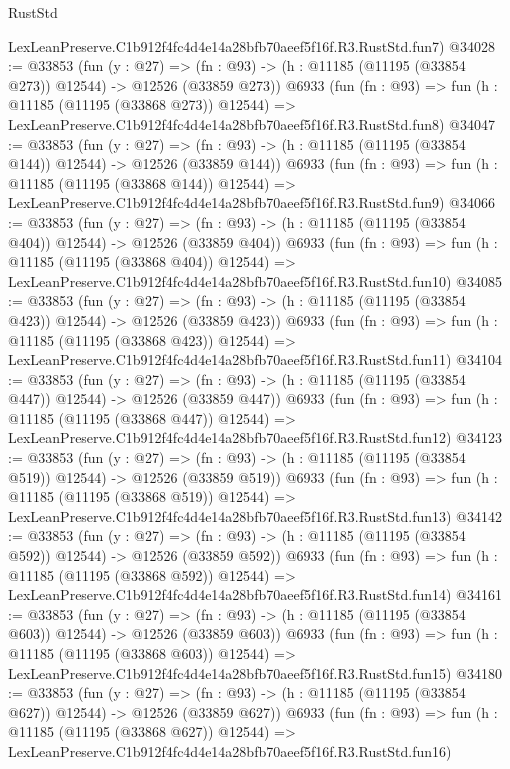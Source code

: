 \begin{lexlean}{RustStd}
\begin{coremodule}
    LexLeanPreserve.C1b912f4fc4d4e14a28bfb70aeef5f16f.R3.RustStd.fun7)
@34028 := @33853
    (fun (y : @27) =>
    (fn : @93) -> (h : @11185 (@11195 (@33854 @273)) @12544) -> @12526 (@33859 @273))
    @6933
    (fun (fn : @93) =>
    fun (h : @11185 (@11195 (@33868 @273)) @12544) =>
    LexLeanPreserve.C1b912f4fc4d4e14a28bfb70aeef5f16f.R3.RustStd.fun8)
@34047 := @33853
    (fun (y : @27) =>
    (fn : @93) -> (h : @11185 (@11195 (@33854 @144)) @12544) -> @12526 (@33859 @144))
    @6933
    (fun (fn : @93) =>
    fun (h : @11185 (@11195 (@33868 @144)) @12544) =>
    LexLeanPreserve.C1b912f4fc4d4e14a28bfb70aeef5f16f.R3.RustStd.fun9)
@34066 := @33853
    (fun (y : @27) =>
    (fn : @93) -> (h : @11185 (@11195 (@33854 @404)) @12544) -> @12526 (@33859 @404))
    @6933
    (fun (fn : @93) =>
    fun (h : @11185 (@11195 (@33868 @404)) @12544) =>
    LexLeanPreserve.C1b912f4fc4d4e14a28bfb70aeef5f16f.R3.RustStd.fun10)
@34085 := @33853
    (fun (y : @27) =>
    (fn : @93) -> (h : @11185 (@11195 (@33854 @423)) @12544) -> @12526 (@33859 @423))
    @6933
    (fun (fn : @93) =>
    fun (h : @11185 (@11195 (@33868 @423)) @12544) =>
    LexLeanPreserve.C1b912f4fc4d4e14a28bfb70aeef5f16f.R3.RustStd.fun11)
@34104 := @33853
    (fun (y : @27) =>
    (fn : @93) -> (h : @11185 (@11195 (@33854 @447)) @12544) -> @12526 (@33859 @447))
    @6933
    (fun (fn : @93) =>
    fun (h : @11185 (@11195 (@33868 @447)) @12544) =>
    LexLeanPreserve.C1b912f4fc4d4e14a28bfb70aeef5f16f.R3.RustStd.fun12)
@34123 := @33853
    (fun (y : @27) =>
    (fn : @93) -> (h : @11185 (@11195 (@33854 @519)) @12544) -> @12526 (@33859 @519))
    @6933
    (fun (fn : @93) =>
    fun (h : @11185 (@11195 (@33868 @519)) @12544) =>
    LexLeanPreserve.C1b912f4fc4d4e14a28bfb70aeef5f16f.R3.RustStd.fun13)
@34142 := @33853
    (fun (y : @27) =>
    (fn : @93) -> (h : @11185 (@11195 (@33854 @592)) @12544) -> @12526 (@33859 @592))
    @6933
    (fun (fn : @93) =>
    fun (h : @11185 (@11195 (@33868 @592)) @12544) =>
    LexLeanPreserve.C1b912f4fc4d4e14a28bfb70aeef5f16f.R3.RustStd.fun14)
@34161 := @33853
    (fun (y : @27) =>
    (fn : @93) -> (h : @11185 (@11195 (@33854 @603)) @12544) -> @12526 (@33859 @603))
    @6933
    (fun (fn : @93) =>
    fun (h : @11185 (@11195 (@33868 @603)) @12544) =>
    LexLeanPreserve.C1b912f4fc4d4e14a28bfb70aeef5f16f.R3.RustStd.fun15)
@34180 := @33853
    (fun (y : @27) =>
    (fn : @93) -> (h : @11185 (@11195 (@33854 @627)) @12544) -> @12526 (@33859 @627))
    @6933
    (fun (fn : @93) =>
    fun (h : @11185 (@11195 (@33868 @627)) @12544) =>
    LexLeanPreserve.C1b912f4fc4d4e14a28bfb70aeef5f16f.R3.RustStd.fun16)

\end{coremodule}
\end{lexlean}
